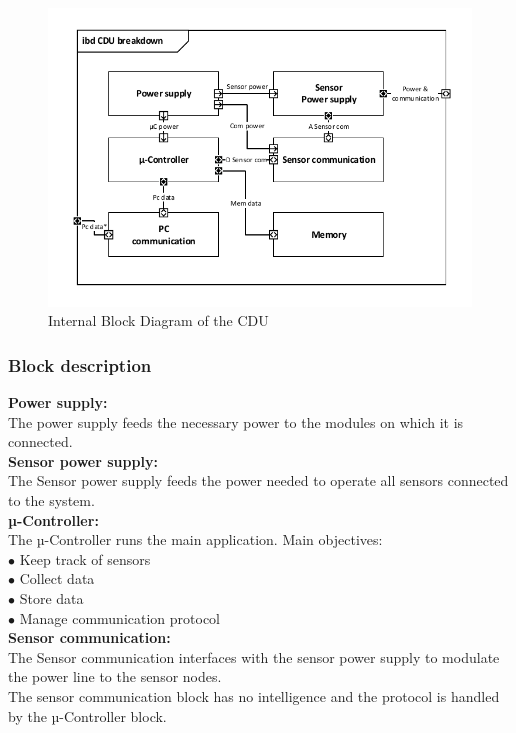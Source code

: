 \begin{figure}[hbpt]
\centering
\includegraphics[width=.8\textwidth]{billeder/CDU_IBD}
\caption{Internal Block Diagram of the CDU}
\label{CDU_IBD}
\end{figure}

\subsubsection{Block description}

\textbf{Power supply:}\\
The power supply feeds the necessary power to the modules on which it is connected.\\

\textbf{Sensor power supply:}\\
The Sensor power supply feeds the power needed to operate all sensors connected to the system.\\

\textbf{µ-Controller:}\\
The µ-Controller runs the main application. Main objectives:\\
$\bullet$ Keep track of sensors\\
$\bullet$ Collect data\\
$\bullet$ Store data\\
$\bullet$ Manage communication protocol\\

\textbf{Sensor communication:}\\
The Sensor communication interfaces with the sensor power supply to modulate the power line to the sensor nodes.\\
The sensor communication block has no intelligence and the protocol is handled by the µ-Controller block.\\

